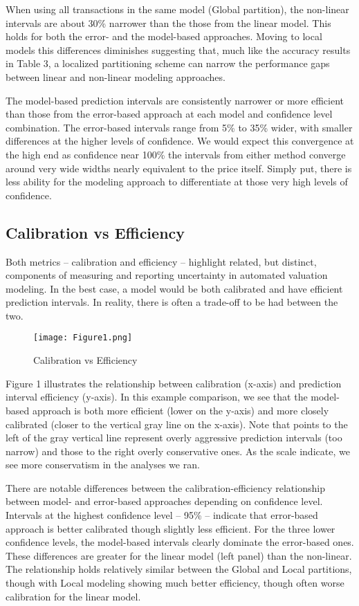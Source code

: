 \documentclass[colTwo]{anon}
\theoremstyle{definition}
\begin{document}
When using all transactions in the same model (Global partition), the non-linear intervals are about 30\% narrower than the those from the linear model.  This holds for both the error- and the model-based approaches. Moving to local models this differences diminishes suggesting that, much like the accuracy results in Table 3, a localized partitioning scheme can narrow the performance gaps between linear and non-linear modeling approaches. 

The model-based prediction intervals are consistently narrower or more efficient than those from the error-based approach at each model and confidence level combination. The error-based intervals range from 5\% to 35\% wider, with smaller differences at the higher levels of confidence.  We would expect this convergence at the high end as confidence near 100\% the intervals from either method converge around very wide widths nearly equivalent to the price itself.  Simply put, there is less ability for the modeling approach to differentiate at those very high levels of confidence.  

\subsection{Calibration vs Efficiency}

Both metrics -- calibration and efficiency -- highlight related, but distinct, components of measuring and reporting uncertainty in  automated valuation modeling.  In the best case, a model would be both calibrated and have efficient prediction intervals. In reality, there is often a trade-off to be had between the two.  

\begin{figure*}[h!]
\centering
\texttt{[image: Figure1.png]}
\caption{Calibration vs Efficiency}
\label{fig:calibsens}
\end{figure*}

Figure 1 illustrates the relationship between calibration (x-axis) and prediction interval efficiency (y-axis). In this example comparison, we see that the model-based approach is both more efficient (lower on the y-axis) and more closely calibrated (closer to the vertical gray line on the x-axis). Note that points to the left of the gray vertical line represent overly aggressive prediction intervals (too narrow) and those to the right overly conservative ones.  As the scale indicate, we see more conservatism in the analyses we ran.     

There are notable differences between the calibration-efficiency relationship between model- and error-based approaches depending on confidence level.  Intervals at the highest confidence level -- 95\% -- indicate that error-based approach is better calibrated though slightly less efficient. For the three lower confidence levels, the model-based intervals clearly dominate the error-based ones. These differences are greater for the linear model (left panel) than the non-linear.  The relationship holds relatively similar between the Global and Local partitions, though with Local modeling showing much better efficiency, though often worse calibration for the linear model.    
\end{document}

